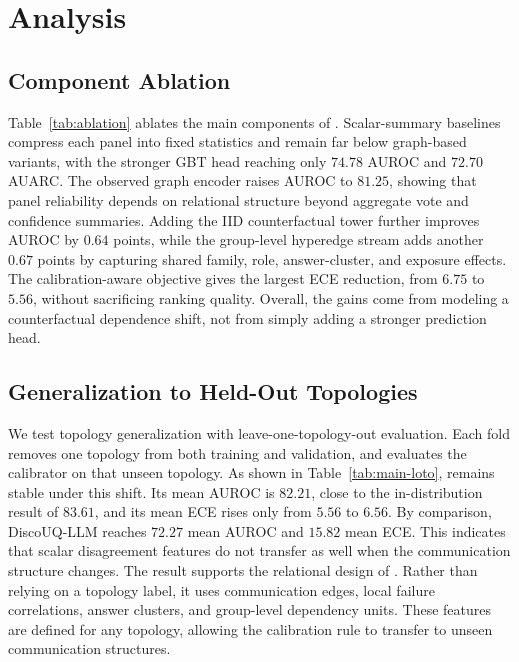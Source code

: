 \section{Analysis}
\label{sec:analysis}






\subsection{Component Ablation}
\label{sec:ablation}

Table~\ref{tab:ablation} ablates the main components of \methodname{}. 
Scalar-summary baselines compress each panel into fixed statistics and remain far below graph-based variants, with the stronger GBT head reaching only $74.78$ AUROC and $72.70$ AUARC. 
The observed graph encoder raises AUROC to $81.25$, showing that panel reliability depends on relational structure beyond aggregate vote and confidence summaries. 
Adding the IID counterfactual tower further improves AUROC by $0.64$ points, while the group-level hyperedge stream adds another $0.67$ points by capturing shared family, role, answer-cluster, and exposure effects. 
The calibration-aware objective gives the largest ECE reduction, from $6.75$ to $5.56$, without sacrificing ranking quality. 
Overall, the gains come from modeling a counterfactual dependence shift, not from simply adding a stronger prediction head.

\subsection{Generalization to Held-Out Topologies}
\label{sec:loto}

We test topology generalization with leave-one-topology-out evaluation. 
Each fold removes one topology from both training and validation, and evaluates the calibrator on that unseen topology.
As shown in Table~\ref{tab:main-loto}, \methodname{} remains stable under this shift. 
Its mean AUROC is $82.21$, close to the in-distribution result of $83.61$, and its mean ECE rises only from $5.56$ to $6.56$. 
By comparison, DiscoUQ-LLM reaches $72.27$ mean AUROC and $15.82$ mean ECE. 
This indicates that scalar disagreement features do not transfer as well when the communication structure changes.
The result supports the relational design of \methodname{}. 
Rather than relying on a topology label, it uses communication edges, local failure correlations, answer clusters, and group-level dependency units. 
These features are defined for any topology, allowing the calibration rule to transfer to unseen communication structures.


